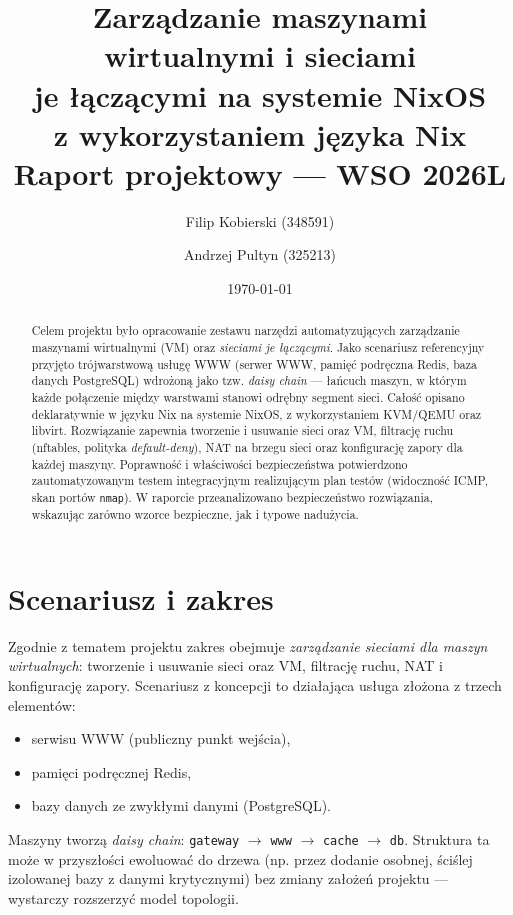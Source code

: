 \documentclass[11pt,a4paper]{article}
\title{\textbf{Zarządzanie maszynami wirtualnymi i sieciami\\
je łączącymi na systemie NixOS\\
z wykorzystaniem języka Nix}\\[0.4em]
\large Raport projektowy --- WSO 2026L}
\author{Filip Kobierski (348591) \and Andrzej Pultyn (325213)}
\date{\today}
\begin{document}
\maketitle

\begin{abstract}
\noindent
Celem projektu było opracowanie zestawu narzędzi automatyzujących zarządzanie
maszynami wirtualnymi (VM) oraz \emph{sieciami je łączącymi}. Jako scenariusz
referencyjny przyjęto trójwarstwową usługę WWW (serwer WWW, pamięć podręczna
Redis, baza danych PostgreSQL) wdrożoną jako tzw. \emph{daisy chain} --- łańcuch
maszyn, w którym każde połączenie między warstwami stanowi odrębny segment
sieci. Całość opisano deklaratywnie w języku Nix na systemie NixOS, z
wykorzystaniem KVM/QEMU oraz libvirt. Rozwiązanie zapewnia tworzenie i usuwanie
sieci oraz VM, filtrację ruchu (nftables, polityka \emph{default-deny}), NAT na
brzegu sieci oraz konfigurację zapory dla każdej maszyny. Poprawność i
właściwości bezpieczeństwa potwierdzono zautomatyzowanym testem integracyjnym
realizującym plan testów (widoczność ICMP, skan portów \texttt{nmap}). W
raporcie przeanalizowano bezpieczeństwo rozwiązania, wskazując zarówno wzorce
bezpieczne, jak i typowe nadużycia.
\end{abstract}

\tableofcontents

\section{Scenariusz i zakres}
Zgodnie z tematem projektu zakres obejmuje \emph{zarządzanie sieciami dla
maszyn wirtualnych}: tworzenie i usuwanie sieci oraz VM, filtrację ruchu,
NAT i konfigurację zapory. Scenariusz z koncepcji to działająca usługa
złożona z trzech elementów:
\begin{itemize}[nosep]
  \item serwisu WWW (publiczny punkt wejścia),
  \item pamięci podręcznej Redis,
  \item bazy danych ze zwykłymi danymi (PostgreSQL).
\end{itemize}
Maszyny tworzą \emph{daisy chain}: \texttt{gateway} $\rightarrow$ \texttt{www}
$\rightarrow$ \texttt{cache} $\rightarrow$ \texttt{db}. Struktura ta może w
przyszłości ewoluować do drzewa (np. przez dodanie osobnej, ściślej izolowanej
bazy z danymi krytycznymi) bez zmiany założeń projektu --- wystarczy rozszerzyć
model topologii.
\end{document}
